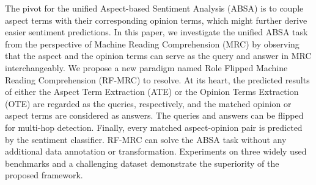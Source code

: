 The pivot for the unified Aspect-based Sentiment Analysis (ABSA) is to couple aspect terms with their corresponding opinion terms, which might further derive easier sentiment predictions. In this paper, we investigate the unified ABSA task from the perspective of Machine Reading Comprehension (MRC) by observing that the aspect and the opinion terms can serve as the query and answer in MRC interchangeably. We propose a new paradigm named Role Flipped Machine Reading Comprehension (RF-MRC) to resolve. At its heart, the predicted results of either the Aspect Term Extraction (ATE) or the Opinion Terms Extraction (OTE) are regarded as the queries, respectively, and the matched opinion or aspect terms are considered as answers. The queries and answers can be flipped for multi-hop detection. Finally, every matched aspect-opinion pair is predicted by the sentiment classifier. RF-MRC can solve the ABSA task without any additional data annotation or transformation. Experiments on three widely used benchmarks and a challenging dataset demonstrate the superiority of the proposed framework.
